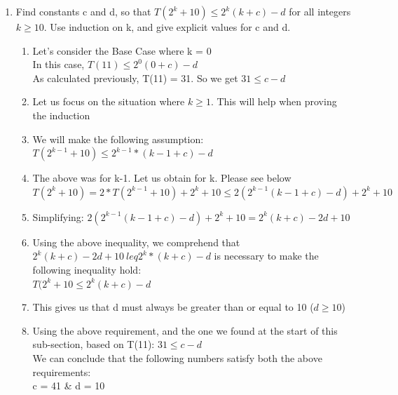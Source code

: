 \documentclass[11pt]{article}
\begin{document}
\begin{enumerate}
\begin{enumerate}
        \item Find constants c and d, so that $T(2^k+10) \leq 2^k(k+c)-d$ for all integers $k \geq 10$. Use induction on k, and give explicit values for c and d.
        \begin{enumerate}
            \item Let's consider the Base Case where k = 0\\
            In this case, $T(11) \leq 2^0(0+c) - d$\\
            As calculated previously, T(11) = 31. So we get $31 \leq c-d$
            \item Let us focus on the situation where $k \geq 1$. This will help when proving the induction
            \item We will make the following assumption:\\
            $T(2^{k-1} + 10) \leq 2^{k-1} * (k-1+c)-d$
            \item The above was for k-1. Let us obtain for k. Please see below\\
            $T(2^k + 10) = 2 * T(2^{k-1} + 10) + 2^k + 10 \leq 2(2^{k-1}(k-1 + c)-d)+2^k + 10$
            \item Simplifying: 
            $2(2^{k-1}(k-1 + c)-d)+2^k + 10 =2^k(k+c)-2d+10$
            \item Using the above inequality, we comprehend that $2^k(k+c)-2d+10 \ leq 2^k*(k+c)-d$ is necessary to make the following inequality hold:\\
            $T(2^k+10 \leq 2^k(k+c)-d$
            \item This gives us that d must always be greater than or equal to 10 ($d \geq 10$)
            \item Using the above requirement, and the one we found at the start of this sub-section, based on T(11): $31 \leq c-d$\\
            We can conclude that the following numbers satisfy both the above requirements:\\
            c = 41 & d = 10
        \end{enumerate}


\end{enumerate}
\end{enumerate}
\end{document}
